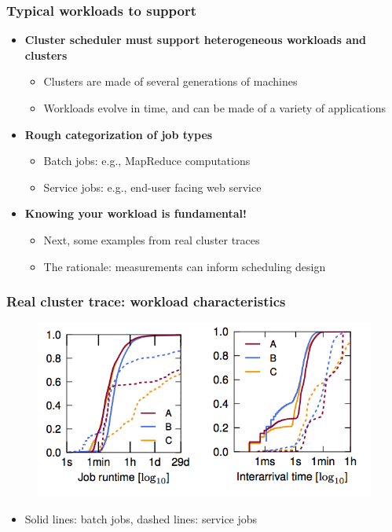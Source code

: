 \begin{frame}\frametitle{Typical workloads to support}
\begin{itemize}
	\item {\bf Cluster scheduler must support heterogeneous workloads and clusters}
	\begin{itemize}
		\item Clusters are made of several generations of machines
		\item Workloads evolve in time, and can be made of a variety of applications
	\end{itemize}

\vspace{10pt}

	\item {\bf Rough categorization of job types}
	\begin{itemize}
		\item Batch jobs: e.g., MapReduce computations
		\item Service jobs: e.g., end-user facing web service
	\end{itemize}

\vspace{10pt}

	\item {\bf Knowing your workload is fundamental!}
	\begin{itemize}
		\item Next, some examples from real cluster traces
		\item The rationale: measurements can inform scheduling design
	\end{itemize}
\end{itemize}
\end{frame}

\begin{frame}\frametitle{Real cluster trace: workload characteristics}
\begin{figure}[h]
  \centering
  \includegraphics[scale=0.4]{./figures/intro_trace1}
  \label{fig:intro_trace1}
\end{figure}
\begin{itemize}
	\item Solid lines: batch jobs, dashed lines: service jobs
\end{itemize}
\end{frame}

